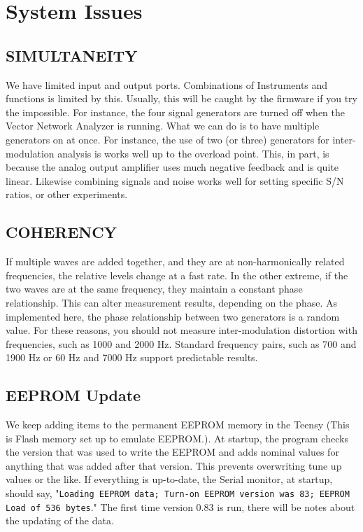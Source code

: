 \section{System Issues}
\label{sect:Sys}

\subsection{SIMULTANEITY}  We have limited input and output ports.  Combinations of Instruments and functions is limited by this.  Usually, this will be caught by the firmware if you try the impossible.  For instance, the four signal generators are turned off when the Vector Network Analyzer is running.  What we can do is to have multiple generators on at once.  For instance, the use of two (or three) generators for inter-modulation analysis is works well up to the overload point.  This, in part, is because the analog output amplifier uses much negative feedback and is quite linear.  Likewise combining signals and noise works well for setting specific S/N ratios, or other experiments.

\subsection{COHERENCY} If multiple waves are added together, and they are at non-harmonically related frequencies, the relative levels change at a fast rate.  In the other extreme, if the two waves are at the same frequency, they maintain a constant phase relationship. This can alter measurement results, depending on the phase. As implemented here, the phase relationship between two generators is a random  value.  For these reasons, you should not measure inter-modulation distortion with frequencies, such as 1000 and 2000 Hz.  Standard frequency pairs, such as 700 and 1900 Hz or 60 Hz and 7000 Hz support predictable results.

\subsection{EEPROM Update} We keep adding items to the permanent EEPROM memory in the Teensy (This is Flash memory set up to emulate EEPROM.).  At startup, the program checks the version that was used to write the EEPROM and adds nominal values for anything that was added after that version.  This prevents overwriting tune up values or the like.  If everything is up-to-date, the Serial monitor, at startup, should say, "\texttt{Loading EEPROM data; Turn-on EEPROM version was 83; EEPROM \newline Load of 536 bytes}."  The first time version 0.83 is run, there will be notes about the updating of the data.
